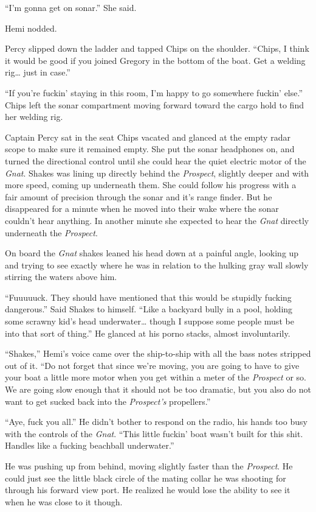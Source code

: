 \documentclass[]{scrbook}
\begin{document}
``I'm gonna get on sonar.'' She said.

Hemi nodded.

Percy slipped down the ladder and tapped Chips on the shoulder. ``Chips,
I think it would be good if you joined Gregory in the bottom of the
boat. Get a welding rig\ldots{} just in case.''

``If you're fuckin' staying in this room, I'm happy to go somewhere
fuckin' else.'' Chips left the sonar compartment moving forward toward
the cargo hold to find her welding rig.

Captain Percy sat in the seat Chips vacated and glanced at the empty
radar scope to make sure it remained empty. She put the sonar headphones
on, and turned the directional control until she could hear the quiet
electric motor of the \emph{Gnat}. Shakes was lining up directly behind
the \emph{Prospect}, slightly deeper and with more speed, coming up
underneath them. She could follow his progress with a fair amount of
precision through the sonar and it's range finder. But he disappeared
for a minute when he moved into their wake where the sonar couldn't hear
anything. In another minute she expected to hear the \emph{Gnat}
directly underneath the \emph{Prospect}.

On board the \emph{Gnat} shakes leaned his head down at a painful angle,
looking up and trying to see exactly where he was in relation to the
hulking gray wall slowly stirring the waters above him.

``Fuuuuuck. They should have mentioned that this would be stupidly
fucking dangerous.'' Said Shakes to himself. ``Like a backyard bully in
a pool, holding some scrawny kid's head underwater\ldots{} though I
suppose some people must be into that sort of thing.'' He glanced at his
porno stacks, almost involuntarily.

``Shakes,'' Hemi's voice came over the ship-to-ship with all the bass
notes stripped out of it. ``Do not forget that since we're moving, you
are going to have to give your boat a little more motor when you get
within a meter of the \emph{Prospect} or so. We are going slow enough
that it should not be too dramatic, but you also do not want to get
sucked back into the \emph{Prospect's} propellers.''

``Aye, fuck you all.'' He didn't bother to respond on the radio, his
hands too busy with the controls of the \emph{Gnat}. ``This little
fuckin' boat wasn't built for this shit. Handles like a fucking
beachball underwater.''

He was pushing up from behind, moving slightly faster than the
\emph{Prospect}. He could just see the little black circle of the mating
collar he was shooting for through his forward view port. He realized he
would lose the ability to see it when he was close to it though.
\end{document}
